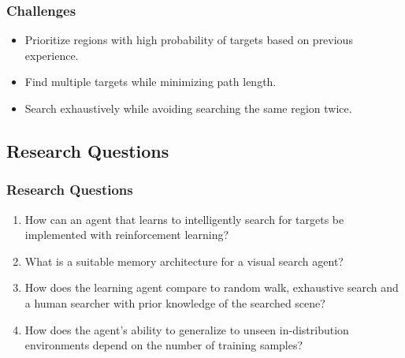 \begin{frame}
    \frametitle{Challenges}

    \begin{itemize}
        \item Prioritize regions with high probability of targets based on previous experience.
        \item Find multiple targets while minimizing path length.
        \item Search exhaustively while avoiding searching the same region twice.
    \end{itemize}
\end{frame}

\subsection{Research Questions}

\begin{frame}
    \frametitle{Research Questions}
    \begin{enumerate}
        \item How can an agent that learns to intelligently search for targets be implemented with reinforcement learning?
        \item What is a suitable memory architecture for a visual search agent?
        \item How does the learning agent compare to random walk, exhaustive search and a human searcher with prior knowledge of the searched scene?
        \item How does the agent's ability to generalize to unseen in-distribution environments depend on the number of training samples?
    \end{enumerate}    
\end{frame}